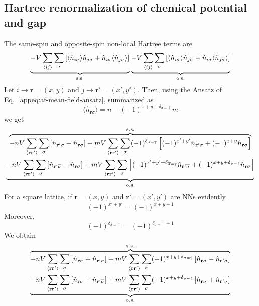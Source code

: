 \subsection{Hartree renormalization of chemical potential and gap}

The same-spin and opposite-spin non-local Hartree terms are
\[
	\underbrace{
		-V \sum_{\ev{ij}} \sum_\sigma \left[
			\langle 
				\hat n_{i\sigma}
			\rangle \hat n_{j\sigma} + \hat n_{i\sigma} \langle 
				\hat n_{j\sigma}
			\rangle
		\right]
	}_{\mathrm{s.s.}}
	\underbrace{
		-V \sum_{\ev{ij}} \sum_\sigma \left[
			\langle
				\hat n_{i\sigma}
			\rangle \hat n_{j\overline{\sigma}} + \hat n_{i\sigma} \langle 
				\hat n_{j\overline{\sigma}}
			\rangle
		\right]
	}_{\mathrm{o.s.}}
\]
Let $i \to \mathbf{r} = (x,y)$ and $j \to \mathbf{r}' = (x',y')$. Then, using the Ansatz of Eq.~\ref{appeq:af-mean-field-ansatz}, summarized as
\[
	\langle \hat n_{\mathbf{r}\sigma} \rangle = n - (-1)^{x+y+\delta_{\sigma=\uparrow}} m
\]
we get
\begin{multline*}
	\overbrace{
		-nV \sum_{\ev{\mathbf{r}\mathbf{r}'}} \sum_\sigma \left[
			\hat n_{\mathbf{r}'\sigma} + \hat n_{\mathbf{r}\sigma}
		\right] + mV \sum_{\ev{\mathbf{r}\mathbf{r}'}} \sum_\sigma (-1)^{\delta_{\sigma=\uparrow}} \left[
			(-1)^{x'+y'} \hat n_{\mathbf{r}'\sigma} + (-1)^{x+y} \hat n_{\mathbf{r}\sigma}
		\right]
	}^{\mathrm{s.s.}} \\
	\underbrace{
		-nV \sum_{\ev{\mathbf{r}\mathbf{r}'}} \sum_\sigma \left[
			\hat n_{\mathbf{r}'\overline{\sigma}} + \hat n_{\mathbf{r}\sigma}
		\right] + mV \sum_{\ev{\mathbf{r}\mathbf{r}'}} \sum_\sigma \left[
			(-1)^{x'+y'+\delta_{\overline{\sigma}=\uparrow}} \hat n_{\mathbf{r}'\overline{\sigma}} + (-1)^{x+y+\delta_{\sigma=\uparrow}} \hat n_{\mathbf{r}\sigma}
		\right]
	}_{\mathrm{o.s.}}
\end{multline*}
For a square lattice, if $\mathbf{r} = (x,y)$ and $\mathbf{r}' = (x',y')$ are NNs evidently
\[
	(-1)^{x'+y'} = (-1)^{x+y+1}
\]
Moreover,
\[
	(-1)^{\delta_{\overline{\sigma}=\uparrow}} = (-1)^{\delta_{\sigma=\uparrow}+1}
\]
We obtain
\begin{multline}
	\overbrace{
		-nV \sum_{\ev{\mathbf{r}\mathbf{r}'}} \sum_\sigma \left[
			\hat n_{\mathbf{r}\sigma} + \hat n_{\mathbf{r}'\sigma}
		\right] + mV \sum_{\ev{\mathbf{r}\mathbf{r}'}} \sum_\sigma (-1)^{x+y+\delta_{\sigma=\uparrow}} \left[
			\hat n_{\mathbf{r}\sigma} - \hat n_{\mathbf{r}'\sigma}
		\right]
	}^{\mathrm{s.s.}} \\
	\underbrace{
		-nV \sum_{\ev{\mathbf{r}\mathbf{r}'}} \sum_\sigma \left[
			\hat n_{\mathbf{r}\sigma} + \hat n_{\mathbf{r}'\overline{\sigma}}
		\right] + mV \sum_{\ev{\mathbf{r}\mathbf{r}'}} \sum_\sigma (-1)^{x+y+\delta_{\sigma=\uparrow}} \left[
			\hat n_{\mathbf{r}\sigma} + \hat n_{\mathbf{r}'\sigma}
		\right]
	}_{\mathrm{o.s.}}
	\label{eq:af-hartree-renormalization-intermediate}
\end{multline}
